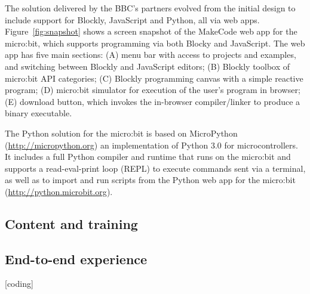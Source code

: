 

The solution delivered by the BBC's partners evolved from the initial
design to include support for Blockly, JavaScript and Python, all
via web apps.
Figure~\ref{fig:snapshot} shows a screen snapshot of the MakeCode web app
for the micro:bit,
which supports programming via both Blocky and JavaScript.
The web app has five main sections: (A) menu bar with access to projects
and examples, and switching between Blockly and JavaScript editors; (B)
Blockly toolbox of micro:bit API categories; (C) Blockly programming
canvas with a simple reactive program; (D) micro:bit simulator for execution
of the user's program in browser; (E) download button, which invokes the in-browser
compiler/linker to produce a binary executable.

The Python solution for the micro:bit is based on MicroPython (\url{http://micropython.org})
an implementation of Python 3.0 for microcontrollers. It includes
a full Python compiler and runtime that runs on the micro:bit and
supports a read-eval-print loop (REPL) to execute commands sent via
a terminal, as well as to import and run scripts from the Python web app for
the micro:bit (\url{http://python.microbit.org}).


\subsection{Content and training}



\subsection{End-to-end experience}

[coding]


